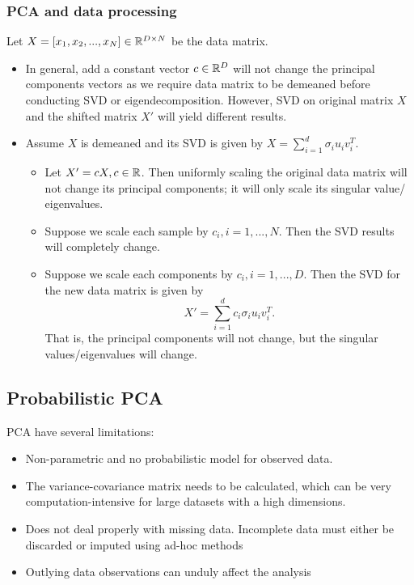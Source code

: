 \begin{refsection}
\subsubsection{PCA and data processing}

\begin{remark}
Let $X = [x_1,x_2,...,x_N] \in \mathbb{R}^{D\times N}$ be the data matrix.	
\begin{itemize}
	\item In general, add a constant vector $c\in \mathbb{R}^D$ will not change the principal components vectors as we require data matrix to be demeaned before conducting SVD or eigendecomposition. However, SVD on original matrix $X$ and the shifted matrix $X'$ will yield different results.
	\item Assume $X$ is demeaned and its SVD is given by
	$X=\sum_{i=1}^d \sigma_i u_iv_i^T$.
	\begin{itemize}
		\item Let $X' = cX, c\in \mathbb{R}$. Then uniformly scaling the original data matrix will not change its principal components; it will only scale its singular value/ eigenvalues.
		\item Suppose we scale each sample by $c_i, i = 1,...,N$. Then the SVD results will completely change.
		\item Suppose we scale each components by $c_i, i=1,...,D$. Then the SVD for the new data matrix is given by
		$$X' = \sum_{i=1}^d c_i\sigma_i u_iv_i^T.$$
		That is, the principal components will not change, but the singular values/eigenvalues will change.  
	\end{itemize}
\end{itemize}

\end{remark}





\subsection{Probabilistic PCA}

\begin{remark}[motivations] PCA have several limitations:
\begin{itemize}
	\item Non-parametric and no probabilistic model for observed data.
	\item The variance-covariance matrix needs to be
	calculated, which can be very computation-intensive for large datasets
	with a high dimensions.
	\item  Does not deal properly with missing data. Incomplete data must either be discarded or imputed	using ad-hoc methods
	\item Outlying data observations can unduly affect the
	analysis
\end{itemize}	


\end{remark}
\end{refsection}
